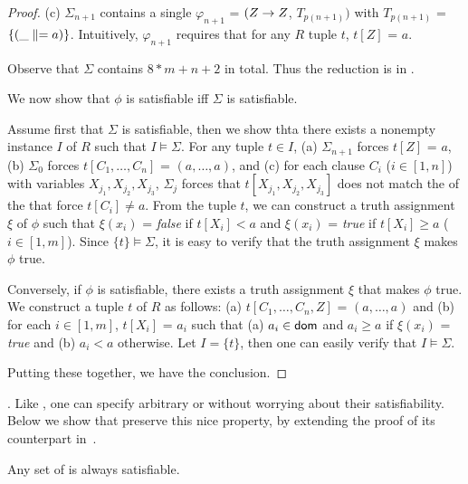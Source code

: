 \begin{proof}
\item[(c)] $\Sigma_{n + 1}$ contains a single \pCFD $\varphi_{n+1}$ =
$(Z \rightarrow Z$, $T_{p(n+1)})$ with $T_{p(n+1)}$ = $\{(\_ \parallel = a)\}$.
Intuitively, $\varphi_{n+1}$ requires that for any $R$ tuple $t$,
$t[Z]$ = $a$.
\ei

Observe that $\Sigma$ contains $8*m + n + 2$ \pCFDs in total. Thus the
reduction is in \PTIME.

We now show that $\phi$ is satisfiable iff $\Sigma$ is satisfiable.

Assume first that $\Sigma$ is satisfiable, then we  show thta there exists a nonempty
instance $I$ of $R$ such that $I\models\Sigma$. For any tuple $t\in
I$, (a) $\Sigma_{n+1}$ forces $t[Z]$ = $a$, (b) $\Sigma_0$ forces
$t[C_1, \ldots, C_n]$ = $(a, \ldots, a)$, and (c) for each clause $C_i$
($i\in[1, n]$) with variables $X_{j_1},X_{j_2},X_{j_3}$, $\Sigma_j$
forces that $t[X_{j_1},X_{j_2},X_{j_3}]$  does not match the \LHS of
the \pCFDs that force $t[C_i]\ne a$. From the tuple $t$, we can construct a
truth assignment $\xi$ of $\phi$ such that $\xi(x_i)$ = {\em false}
if $t[X_i]< a$ and  $\xi(x_i)$ = {\em true} if $t[X_i]\ge a$
($i\in[1, m]$). Since $\{t\}\models\Sigma$, it is easy to verify
that the truth assignment $\xi$ makes $\phi$ true.

Conversely, if $\phi$ is satisfiable, there exists a truth
assignment $\xi$ that makes $\phi$ true. We construct a tuple $t$ of
$R$ as follows: (a) $t[C_1,\ldots, C_n, Z]$ = $(a, \ldots, a)$ and
(b) for each $i\in[1, m]$, $t[X_i]$ = $a_i$ such that (a) $a_i\in\protect\mathsf{dom}$ and
$a_i\ge a$ if $\xi(x_i)$ = {\em true} and (b) $a_i< a$ otherwise. Let $I
= \{t\}$, then one can easily verify that $I\models\Sigma$.


Putting these together, we have the conclusion.
\end{proof}



. Like \FDs,
one can specify arbitrary \INDs or \CINDs without worrying about
their satisfiability. Below we show that \pCINDs preserve this nice
property, by extending the proof of its counterpart in~\cite{tcs-CINDs}.

\begin{prop}
\label{thm-sat-pcind} Any set of \pCINDs is always
satisfiable.
\end{prop}

